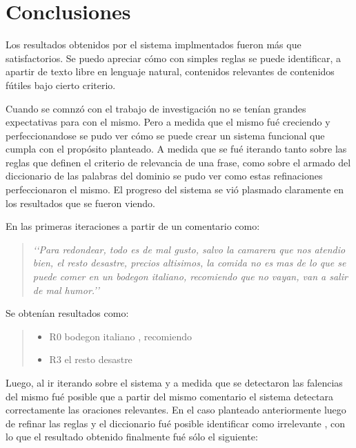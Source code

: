 \section{Conclusiones}

Los resultados obtenidos por el sistema implmentados fueron más que satisfactorios. Se puedo apreciar cómo con simples reglas se puede identificar, a apartir de texto libre en lenguaje natural, contenidos relevantes de contenidos fútiles bajo cierto criterio.

Cuando se comnzó con el trabajo de investigación no se tenían grandes expectativas para con el mismo. Pero a medida que el mismo fué creciendo y perfeccionandose se pudo ver cómo se puede crear un sistema funcional que cumpla con el propósito planteado. A medida que se fué iterando tanto sobre las reglas que definen el criterio de relevancia de una frase, como sobre el armado del diccionario de las palabras del dominio se pudo ver como estas refinaciones perfeccionaron el mismo. El progreso del sistema se vió plasmado claramente en los resultados que se fueron viendo.

En las primeras iteraciones a partir de un comentario como:

\begin{quotation}
\emph{
\lq\lq{}Para redondear, todo es de mal gusto, salvo la camarera que nos atendio bien, el resto desastre, precios altisimos, la comida no es mas de lo que se puede comer en un bodegon italiano, recomiendo que no vayan, van a salir de mal humor.\rq\rq{}
}

\end{quotation}

Se obtenían resultados como:

\begin{quotation}
\begin{itemize}
\item R0  bodegon italiano , recomiendo
\item R3  el resto desastre
\end{itemize}
\end{quotation}

Luego, al ir iterando sobre el sistema y a medida que se detectaron las falencias del mismo fué posible que a partir del mismo comentario el sistema detectara correctamente las oraciones relevantes. En el caso planteado anteriormente luego de refinar las reglas y el diccionario fué posible identificar como irrelevante , con lo que el resultado obtenido finalmente fué sólo el siguiente:


